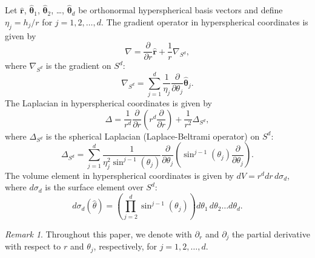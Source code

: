 \documentclass[11pt]{amsart}
\theoremstyle{definition}
\theoremstyle{plain}
\theoremstyle{remark}
\newtheorem{remark}[definition]{Remark}
\newcommand{\del}{\partial}
\renewcommand{\vec}[1]{\hat{\boldsymbol{#1}}}
\begin{document}
Let $\vec{r}$, $\vec{\theta}_1$, $\vec{\theta}_2$, \dots, $\vec{\theta}_d$ be orthonormal hyperspherical basis vectors and define $\eta_j = h_j/r$ for $j = 1, 2, \dots, d$. The gradient operator in hyperspherical coordinates is given by 
\begin{equation*} 
\nabla = \frac{\del}{\del r}\vec{r} + \frac{1}{r}\nabla_{S^d}, 
\end{equation*} 
where $\nabla_{S^d}$ is the gradient on $S^d$:  
\begin{equation} \label{eq:SCgrad} 
\nabla_{S^d} = \sum_{j = 1}^d \frac{1}{\eta_j}\frac{\del}{\del\theta_j}\vec{\theta}_j. 
\end{equation} 
The Laplacian in hyperspherical coordinates is given by 
\begin{equation*} 
\Delta = \frac{1}{r^d}\frac{\del}{\del r}\left(r^d\frac{\del}{\del r}\right) + \frac{1}{r^2}\Delta_{S^d}, 
\end{equation*} 
where $\Delta_{S^d}$ is the spherical Laplacian (Laplace-Beltrami operator) on $S^d$: 
\begin{equation} \label{eq:SCbeltrami} 
\Delta_{S^d} = \sum_{j = 1}^d \frac{1}{\eta_j^2\sin^{j - 1}(\theta_j)}\frac{\del}{\del\theta_j}\left(\sin^{j - 1}(\theta_j)\frac{\del}{\del\theta_j}\right). 
\end{equation} 
The volume element in hyperspherical coordinates is given by $dV = r^d dr\, d\sigma_d$, where $d\sigma_d$ is the surface element over $S^d$: 
\begin{equation*} \label{eq:SCsurface} 
d\sigma_d(\hat\theta) = \left(\prod_{j = 2}^d \sin^{j - 1}(\theta_j)\right) d\theta_1\, d\theta_2\dots d\theta_d.  
\end{equation*} 

\begin{remark} 
Throughout this paper, we denote with $\del_r$ and $\del_j$ the partial derivative with respect to $r$ and $\theta_j$, respectively, for $j = 1, 2, \dots, d$. 
\end{remark} 

\end{document}
